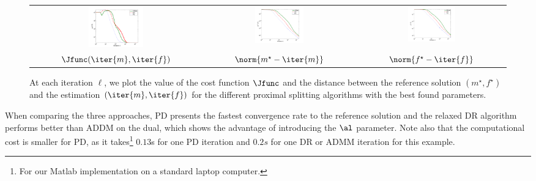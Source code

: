 \begin{figure}[!ht]
\begin{center}
\begin{tabular}{ccc}
\includegraphics[trim=30 10 40 20,clip,width=0.33\textwidth]{images/J}&\hspace{-0.5cm}
\includegraphics[trim=30 10 40 20,clip,width=0.33\textwidth]{images/convergence_m}&\hspace{-0.5cm}
\includegraphics[trim=30 10 40 20,clip,width=0.33\textwidth]{images/convergence_f}\vspace{0.1cm}\\
$\Jfunc( \iter{m}, \iter{f} )$&\hspace{-0.5cm}$ \norm{m^\star-\iter{m}}$ &\hspace{-0.5cm}$ \norm{f^\star-\iter{f}}$ \vspace{-0.2cm}
\end{tabular}
\caption{\label{fig:comp_bump} 
	At each iteration $\ell$, we plot the value of the cost function $\Jfunc$ and the distance between the reference solution $(m^\star,f^\star)$ and the estimation $(\iter{m},\iter{f})$ for the different proximal splitting algorithms with the best found parameters. }
\end{center}
\end{figure}

When comparing the three approaches, PD presents the fastest convergence rate to the reference solution and the relaxed DR algorithm performs better than ADDM on the dual, which shows the advantage of introducing the $\al$ parameter. Note also that the computational cost is smaller for PD, as it takes\footnote{For our Matlab implementation on a standard laptop computer.} $0.13$s for one PD iteration and $0.2s$ for one DR or ADMM iteration for this example. 

